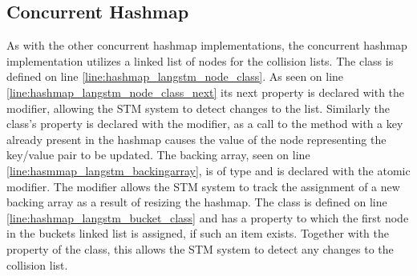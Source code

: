 \subsection{Concurrent Hashmap}
As with the other concurrent hashmap implementations, the \stmname concurrent hashmap implementation utilizes a linked list of nodes for the collision lists. The  class is defined on line \ref{line:hashmap_langstm_node_class}. As seen on line \ref{line:hashmap_langstm_node_class_next} its next property is declared with the  modifier, allowing the \ac{STM} system to detect changes to the list. Similarly the  class's  property is declared with the  modifier, as a call to the  method with a key already present in the hashmap causes the value of the node representing the key/value pair to be updated. The backing array, seen on line \ref{line:hasmmap_langstm_backingarray}, is of type  and is declared with the atomic modifier. The  modifier allows the \ac{STM} system to track the assignment of a new backing array as a result of resizing the hashmap. The  class is defined on line \ref{line:hashmap_langstm_bucket_class} and has a  property to which the first node in the buckets linked list is assigned, if such an item exists. Together with the  property of the  class, this allows the \ac{STM} system to detect any changes to the collision list. 

